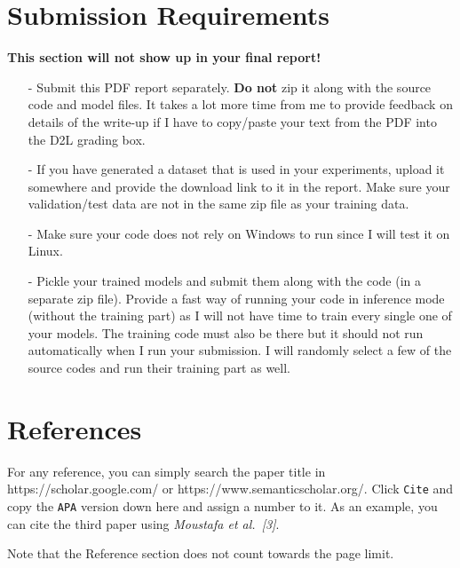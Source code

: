 \documentclass{article}
\begin{document}
\section*{Submission Requirements}
    \textbf{This section will not show up in your final report!}\\
    \begin{itemize}
        \item[-] Submit this PDF report separately. \textbf{Do not} zip it along with the source code and model files. It takes a lot more time from me to provide feedback on details of the write-up if I have to copy/paste your text from the PDF into the D2L grading box.

        \item[-] If you have generated a dataset that is used in your experiments, upload it somewhere and provide the download link to it in the report. Make sure your validation/test data are not in the same zip file as your training data.

        \item[-] Make sure your code does not rely on Windows to run since I will test it on Linux.

        \item[-] Pickle your trained models and submit them along with the code (in a separate zip file). Provide a fast way of running your code in inference mode (without the training part) as I will not have time to train every single one of your models. The training code must also be there but it should not run automatically when I run your submission. I will randomly select a few of the source codes and run their training part as well.
    \end{itemize}


\section*{References}
For any reference, you can simply search the paper title in https://scholar.google.com/ or https://www.semanticscholar.org/. Click \texttt{Cite} and copy the \texttt{APA} version down here and assign a number to it. As an example, you can cite the third paper using \textit{Moustafa et al.\ [3]}.

Note that the Reference section does not count towards the page limit.
\medskip
\end{document}
